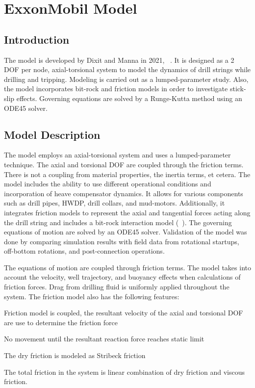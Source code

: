 \chapter{ExxonMobil Model}
\label{ch:exxonmobilmodel}

\section{Introduction}
The model is developed by Dixit and Manna in 2021, ~\cite{ref:dixit2021a}. It is designed as a 2 DOF per node, axial-torsional system to model the dynamics of drill strings while drilling and tripping. Modeling is carried out as a lumped-parameter study. Also, the model incorporates bit-rock and friction models in order to investigate stick-slip effects. Governing equations are solved by a Runge-Kutta method using an ODE45 solver.

\section{Model Description}
The model employs an axial-torsional system and uses a lumped-parameter technique.  The axial and torsional DOF are coupled through the friction terms.  There is not a coupling from material properties, the inertia terms, et cetera.  The model includes the ability to use different operational conditions and incorporation of heave compensator dynamics.  It allows for various components such as drill pipes, HWDP, drill collars, and mud-motors. Additionally, it integrates friction models to represent the axial and tangential forces acting along the drill string and includes a bit-rock interaction model (~\cite{ref:dixit2021a}). The governing equations of motion are solved by an ODE45 solver. Validation of the model was done by comparing simulation results with field data from rotational startups, off-bottom rotations, and post-connection operations.

The equations of motion are coupled through friction terms. The model takes into account the velocity, well trajectory, and buoyancy effects when calculations of friction forces. Drag from drilling fluid is uniformly applied throughout the system. The friction model also has the following features:
\begin{bulletedlist}
    \item Friction model is coupled, the resultant velocity of the axial and torsional DOF are use to determine the friction force
    \item No movement until the resultant reaction force reaches static limit
    \item The dry friction is modeled as Stribeck friction \resolvedcomment{}
    \item The total friction in the system is linear combination of dry friction and viscous friction.
\end{bulletedlist}

